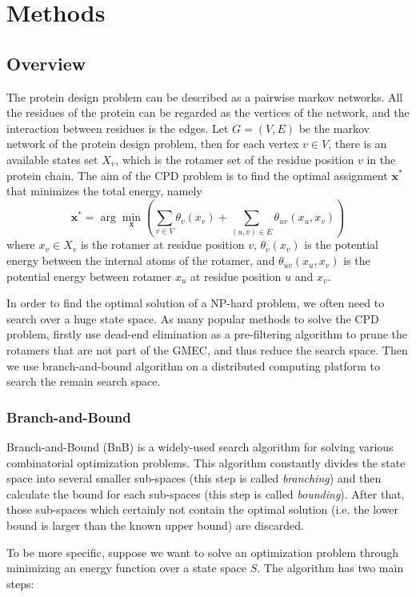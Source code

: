 \section{Methods}
\subsection{Overview}
The protein design problem can be described as a pairwise markov networks. All the residues of the protein can be regarded as the vertices of the network, and the interaction between residues is the edges. Let $G=(V,E)$ be the markov network of the protein design problem, then for each vertex $v\in V$, there is an available states set $X_v$, which is the rotamer set of the residue position $v$ in the protein chain. The aim of the CPD problem is to find the optimal assignment $\mathbf{x^*}$ that minimizes the total energy, namely
\[ \mathbf{x^*} = \arg\min_{\mathbf{x}}\left(\sum_{v\in V}\theta_v(x_v) + \sum_{(u,v)\in E}\theta_{uv}(x_u,x_v)\right) \]
where $x_v\in X_v$ is the rotamer at residue position $v$, $\theta_v(x_v)$ is the potential energy between the internal atoms of the rotamer, and $\theta_{uv}(x_u,x_v)$ is the potential energy between rotamer $x_u$ at residue position $u$ and $x_v$.

In order to find the optimal solution of a NP-hard problem, we often need to search over a huge state space. As many popular methods to solve the CPD problem, firstly use dead-end elimination as a pre-filtering algorithm to prune the rotamers that are not part of the GMEC, and thus reduce the search space. Then we use branch-and-bound algorithm on a distributed computing platform to search the remain search space.

\subsubsection{Branch-and-Bound}
Branch-and-Bound (BnB) is a widely-used search algorithm for solving various combinatorial optimization problems. This algorithm constantly divides the state space into several smaller sub-spaces (this step is called \textit{branching}) and then calculate the bound for each sub-spaces (this step is called \textit{bounding}). After that, those sub-spaces which certainly not contain the optimal solution (i.e. the lower bound is larger than the known upper bound) are discarded.

To be more specific, suppose we want to solve an optimization problem through minimizing an energy function over a state space $S$. The algorithm has two main steps:

